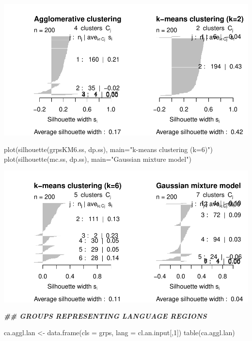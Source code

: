 \documentclass[
]{article}
\newenvironment{Shaded}{\begin{snugshade}}{\end{snugshade}}
\newcommand{\AttributeTok}[1]{\textcolor[rgb]{0.77,0.63,0.00}{#1}}
\newcommand{\DecValTok}[1]{\textcolor[rgb]{0.00,0.00,0.81}{#1}}
\newcommand{\DocumentationTok}[1]{\textcolor[rgb]{0.56,0.35,0.01}{\textbf{\textit{#1}}}}
\newcommand{\FunctionTok}[1]{\textcolor[rgb]{0.00,0.00,0.00}{#1}}
\newcommand{\NormalTok}[1]{#1}
\newcommand{\OtherTok}[1]{\textcolor[rgb]{0.56,0.35,0.01}{#1}}
\newcommand{\StringTok}[1]{\textcolor[rgb]{0.31,0.60,0.02}{#1}}
\begin{document}
\includegraphics{Influence_factors_files/figure-latex/3.11_ca_comparison_munic-2.pdf}

\begin{Shaded}
\begin{Highlighting}[]
\FunctionTok{plot}\NormalTok{(}\FunctionTok{silhouette}\NormalTok{(grpsKM6.ss, dp.ss), }\AttributeTok{main=}\StringTok{"k{-}means clustering (k=6)"}\NormalTok{)}
\FunctionTok{plot}\NormalTok{(}\FunctionTok{silhouette}\NormalTok{(mc.ss, dp.ss), }\AttributeTok{main=}\StringTok{"Gaussian mixture model"}\NormalTok{)}
\end{Highlighting}
\end{Shaded}

\includegraphics{Influence_factors_files/figure-latex/3.11_ca_comparison_munic-3.pdf}

\begin{Shaded}
\begin{Highlighting}[]
\DocumentationTok{\#\# GROUPS REPRESENTING LANGUAGE REGIONS}

\NormalTok{ca.aggl.lan }\OtherTok{\textless{}{-}} \FunctionTok{data.frame}\NormalTok{(}\AttributeTok{cls =}\NormalTok{ grps, }\AttributeTok{lang =}\NormalTok{ cl.an.input[,}\DecValTok{1}\NormalTok{])}
\FunctionTok{table}\NormalTok{(ca.aggl.lan)}
\end{Highlighting}
\end{Shaded}
\end{document}
